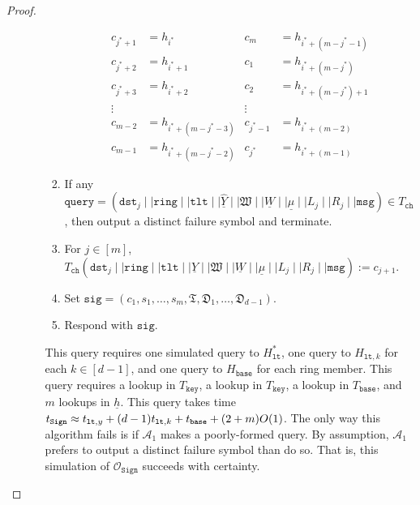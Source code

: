 \documentclass[11pt]{article}
\theoremstyle{definition}
\newcommand{\lt}{\texttt{lt}}
\newcommand{\tlt}{\texttt{tlt}}
\newcommand{\ring}{\texttt{ring}}
\newcommand{\sig}{\texttt{sig}}
\newcommand{\msg}{\texttt{msg}}
\newcommand{\sign}{\texttt{Sign}}
\newcommand{\signingOracle}{\mathcal{O}_{\sign}}
\newcommand{\signaturequery}{(\texttt{dst}_{j} \mid \mid \ring \mid \mid \tlt \mid \mid \underline{\widehat{Y}} \mid \mid \mathfrak{W} \mid \mid \underline{W} \mid \mid \underline{\mu} \mid \mid L_{j} \mid \mid R_{j} \mid \mid \msg)}
\begin{document}
\begin{proof}
\begin{enumerate}
\begin{enumerate}
\begin{enumerate}
\begin{align*}
c_{j^*+1} &= h_{i^*} & c_m &= h_{i^* + (m-j^* - 1)} \\
c_{j^*+2} &= h_{i^*+1} & c_1 &= h_{i^* + (m-j^*)} \\
c_{j^*+3} &= h_{i^*+2} & c_2 &= h_{i^* + (m-j^*) + 1} \\
\vdots & & \vdots & \\
c_{m-2} &= h_{i^* + (m-j^*-3)} & c_{j^* - 1} &= h_{i^* + (m-2)} \\
c_{m-1} &= h_{i^* + (m-j^*-2)} & c_{j^*} &= h_{i^* + (m-1)}
\end{align*}
\item If any
$\texttt{query} = \signaturequery \in T_{\texttt{ch}}$, then output a distinct failure symbol and terminate. 
\item For $j \in [m]$, $T_{\texttt{ch}}\signaturequery := c_{j+1}$.
\item Set $\sig = (c_1, s_1, \ldots, s_m, \mathfrak{T}, \mathfrak{D}_1, \ldots, \mathfrak{D}_{d-1})$.
\item Respond with $\sig$.
\end{enumerate}
This query requires one simulated query to $H_{\lt}^*$, one query to $H_{\lt, k}$ for each $k \in [d-1]$, and one query to $H_{\texttt{base}}$ for each ring member. This query requires a lookup in $T_{\texttt{key}}$, a lookup in $T_{\texttt{key}}$, a lookup in $T_{\texttt{base}}$, and $m$ lookups in $\underline{h}$. This query takes time $t_{\texttt{\sign}} \approx t_{\lt, y} + (d-1)t_{\lt,k} + t_{\texttt{base}} + (2+m)O(1)$. The only way this algorithm fails is if $\mathcal{A}_1$ makes a poorly-formed query. By assumption, $\mathcal{A}_1$ prefers to output a distinct failure symbol than do so. That is, this simulation of $\signingOracle$ succeeds with certainty. 
\end{enumerate}



\end{enumerate}
\end{proof}
\end{document}
